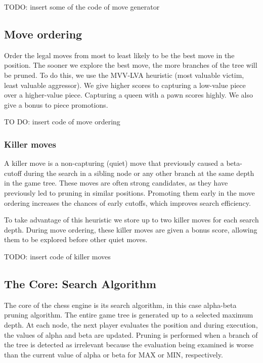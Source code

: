 TODO: insert some of the code of move generator

\subsection{Move ordering}

Order the legal moves from most to least likely to be the best move in the position. The sooner we explore the best move, the more branches of the tree will be pruned. To do this, we use the MVV-LVA heuristic (most valuable victim, least valuable aggressor). We give higher scores to capturing a low-value piece over a higher-value piece. Capturing a queen with a pawn scores highly. We also give a bonus to piece promotions.

\vspace{1em}

TO DO: insert code of move ordering

\subsubsection{Killer moves}

A killer move is a non-capturing (quiet) move that previously caused a beta-cutoff during the search in a sibling node or any other branch at the same depth in the game tree. These moves are often strong candidates, as they have previously led to pruning in similar positions. Promoting them early in the move ordering increases the chances of early cutoffs, which improves search efficiency.

\vspace{1em}

\noindent To take advantage of this heuristic we store up to two killer moves for each search depth. During move ordering, these killer moves are given a bonus score, allowing them to be explored before other quiet moves.

\vspace{1em}

TODO: insert code of killer moves

\subsection{The Core: Search Algorithm}

The core of the chess engine is its search algorithm, in this case alpha-beta pruning algorithm. The entire game tree is generated up to a selected maximum depth. At each node, the next player evaluates the position and during execution, the values of alpha and beta are updated. Pruning is performed when a branch of the tree is detected as irrelevant because the evaluation being examined is worse than the current value of alpha or beta for MAX or MIN, respectively.

